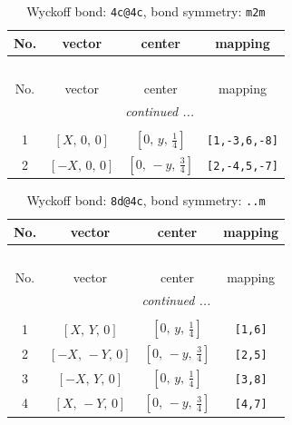 \documentclass[fleqn,8pt]{jsarticle}
\begin{document}
\begin{longtable}{cccc}
\caption{Wyckoff bond: {\tt 4c@4c}, bond symmetry: {\tt m2m}}
 \\
 \hline \hline
No. & vector & center & mapping \\ \hline \endfirsthead

\multicolumn{3}{l}{\tablename\ \thetable{}} \\
 \hline \hline
No. & vector & center & mapping \\ \hline \endhead

 \hline \hline
\multicolumn{3}{r}{\footnotesize\it continued ...} \\ \endfoot

 \hline \hline
\multicolumn{3}{r}{} \\ \endlastfoot

1 & $\left[ X,\, 0,\, 0 \right]$ & $\left[ 0,\, y,\, \frac{1}{4} \right]$ & {\tt [1,-3,6,-8]} \\ \hline
2 & $\left[ - X,\, 0,\, 0 \right]$ & $\left[ 0,\, - y,\, \frac{3}{4} \right]$ & {\tt [2,-4,5,-7]} \\
\end{longtable}
\renewcommand{\arraystretch}{1.2}
\begin{longtable}{cccc}
\caption{Wyckoff bond: {\tt 8d@4c}, bond symmetry: {\tt ..m}}
 \\
 \hline \hline
No. & vector & center & mapping \\ \hline \endfirsthead

\multicolumn{3}{l}{\tablename\ \thetable{}} \\
 \hline \hline
No. & vector & center & mapping \\ \hline \endhead

 \hline \hline
\multicolumn{3}{r}{\footnotesize\it continued ...} \\ \endfoot

 \hline \hline
\multicolumn{3}{r}{} \\ \endlastfoot

1 & $\left[ X,\, Y,\, 0 \right]$ & $\left[ 0,\, y,\, \frac{1}{4} \right]$ & {\tt [1,6]} \\ \hline
2 & $\left[ - X,\, - Y,\, 0 \right]$ & $\left[ 0,\, - y,\, \frac{3}{4} \right]$ & {\tt [2,5]} \\ \hline
3 & $\left[ - X,\, Y,\, 0 \right]$ & $\left[ 0,\, y,\, \frac{1}{4} \right]$ & {\tt [3,8]} \\ \hline
4 & $\left[ X,\, - Y,\, 0 \right]$ & $\left[ 0,\, - y,\, \frac{3}{4} \right]$ & {\tt [4,7]} \\
\end{longtable}
\end{document}
